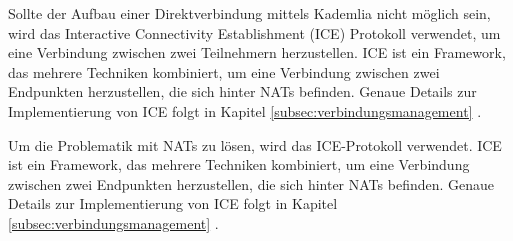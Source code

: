 Sollte der Aufbau einer Direktverbindung mittels Kademlia nicht möglich sein, wird das Interactive Connectivity Establishment (ICE) Protokoll verwendet, um eine Verbindung zwischen zwei Teilnehmern herzustellen. ICE ist ein Framework, das mehrere Techniken kombiniert, um eine Verbindung zwischen zwei Endpunkten herzustellen, die sich hinter NATs befinden. Genaue Details zur Implementierung von ICE folgt in Kapitel \ref{subsec:verbindungsmanagement} \textit{}.

Um die Problematik mit NATs zu lösen, wird das ICE-Protokoll verwendet. ICE ist ein Framework, das mehrere Techniken kombiniert, um eine Verbindung zwischen zwei Endpunkten herzustellen, die sich hinter NATs befinden. Genaue Details zur Implementierung von ICE folgt in Kapitel \ref{subsec:verbindungsmanagement} \textit{}.


